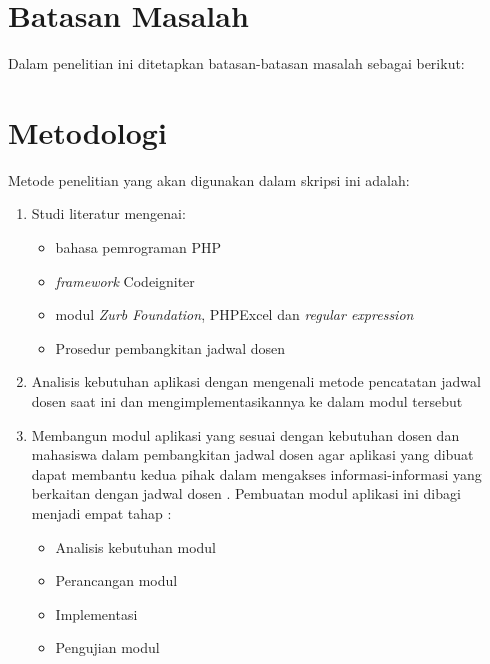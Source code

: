 \section{Batasan Masalah}
\label{sec:batasan}
Dalam penelitian ini ditetapkan batasan-batasan masalah sebagai berikut:

\section{Metodologi}
\label{sec:metlit}
Metode penelitian yang akan digunakan dalam skripsi ini adalah:
\begin{enumerate}
   \item Studi literatur mengenai:
   		\begin{itemize}
 		\item bahasa pemrograman PHP
 		\item \textit{framework} Codeigniter
 		\item modul \textit{Zurb Foundation}, PHPExcel dan \textit{regular expression}
 		\item Prosedur pembangkitan jadwal dosen
		\end{itemize}
   \item Analisis kebutuhan aplikasi dengan mengenali metode pencatatan jadwal dosen saat ini dan mengimplementasikannya ke dalam modul tersebut
    \item Membangun modul aplikasi yang sesuai dengan kebutuhan dosen dan mahasiswa dalam pembangkitan jadwal dosen agar aplikasi yang dibuat dapat membantu kedua pihak dalam mengakses informasi-informasi yang berkaitan dengan jadwal dosen . Pembuatan modul aplikasi ini dibagi menjadi empat tahap :
    	\begin{itemize}
 		\item Analisis kebutuhan modul 
 		\item Perancangan modul
 		\item Implementasi 
 		\item Pengujian modul
		\end{itemize}
\end{enumerate}
 

